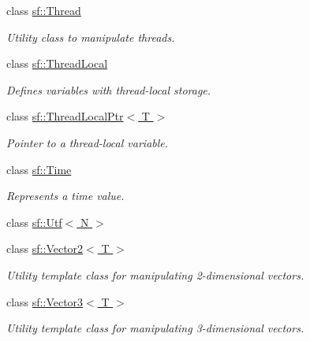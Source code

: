 \begin{DoxyCompactItemize}
class \hyperlink{classsf_1_1_thread}{sf\-::\-Thread}
\begin{DoxyCompactList}\small\item\em Utility class to manipulate threads. \end{DoxyCompactList}\item 
class \hyperlink{classsf_1_1_thread_local}{sf\-::\-Thread\-Local}
\begin{DoxyCompactList}\small\item\em Defines variables with thread-\/local storage. \end{DoxyCompactList}\item 
class \hyperlink{classsf_1_1_thread_local_ptr}{sf\-::\-Thread\-Local\-Ptr$<$ T $>$}
\begin{DoxyCompactList}\small\item\em Pointer to a thread-\/local variable. \end{DoxyCompactList}\item 
class \hyperlink{classsf_1_1_time}{sf\-::\-Time}
\begin{DoxyCompactList}\small\item\em Represents a time value. \end{DoxyCompactList}\item 
class \hyperlink{classsf_1_1_utf}{sf\-::\-Utf$<$ N $>$}
\item 
class \hyperlink{classsf_1_1_vector2}{sf\-::\-Vector2$<$ T $>$}
\begin{DoxyCompactList}\small\item\em Utility template class for manipulating 2-\/dimensional vectors. \end{DoxyCompactList}\item 
class \hyperlink{classsf_1_1_vector3}{sf\-::\-Vector3$<$ T $>$}
\begin{DoxyCompactList}\small\item\em Utility template class for manipulating 3-\/dimensional vectors. \end{DoxyCompactList}\end{DoxyCompactItemize}
